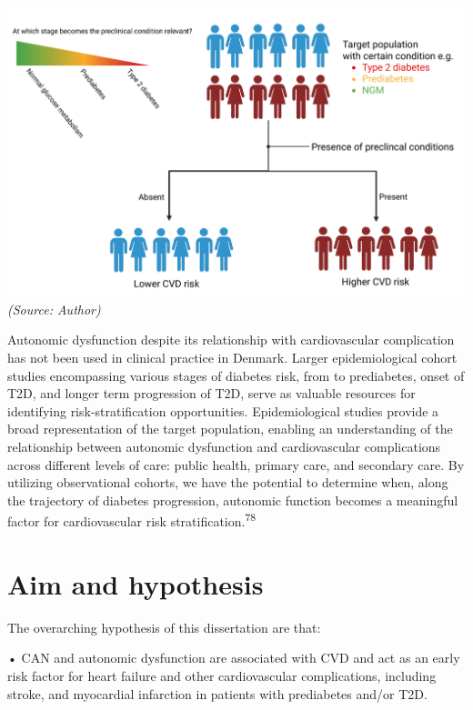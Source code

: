 \documentclass[
  a4paper,
  headsepline=true,
  open=left]{scrbook}
\begin{document}
\includegraphics{images/risk_stratification.pdf} \emph{(Source: Author)}

Autonomic dysfunction despite its relationship with cardiovascular
complication has not been used in clinical practice in Denmark. Larger
epidemiological cohort studies encompassing various stages of diabetes
risk, from to prediabetes, onset of T2D, and longer term progression of
T2D, serve as valuable resources for identifying risk-stratification
opportunities. Epidemiological studies provide a broad representation of
the target population, enabling an understanding of the relationship
between autonomic dysfunction and cardiovascular complications across
different levels of care: public health, primary care, and secondary
care. By utilizing observational cohorts, we have the potential to
determine when, along the trajectory of diabetes progression, autonomic
function becomes a meaningful factor for cardiovascular risk
stratification.\textsuperscript{78}

\clearpage
\null
\thispagestyle{empty}
\clearpage


\hypertarget{aim-and-hypothesis}{%
\chapter{Aim and hypothesis}\label{aim-and-hypothesis}}

\clearpage
\null
\thispagestyle{empty}
\clearpage

The overarching hypothesis of this dissertation are that:

• CAN and autonomic dysfunction are associated with CVD and act as an
early risk factor for heart failure and other cardiovascular
complications, including stroke, and myocardial infarction in patients
with prediabetes and/or T2D.
\end{document}

